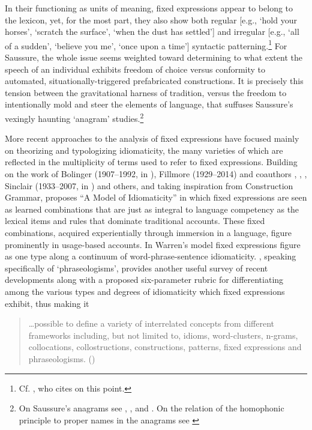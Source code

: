 \documentclass[output=paper]{langsci/langscibook}
\begin{document}
In their functioning as units of meaning, fixed expressions appear to belong to the lexicon, yet, for the most part, they also show both regular [e.g., ‘hold your horses’, ‘scratch the surface’, ‘when the dust has settled’] and irregular [e.g., ‘all of a sudden’, ‘believe you me’, ‘once upon a time’] syntactic patterning.\footnote{{Cf. \citet[2--3]{wood_formulaic_2002}, who cites \citet[36]{richards_two_1983} on this point.}} For Saussure, the whole issue seems weighted toward determining to what extent the speech of an individual exhibits freedom of choice versus conformity to automated, situationally-triggered prefabricated constructions. It is precisely this tension between the gravitational harness of tradition, versus the freedom to intentionally mold and steer the elements of language, that suffuses Saussure’s vexingly haunting ‘anagram’ studies.\footnote{ \textrm{On Saussure’s anagrams see \citealt{guimaraes_presence_2007}, \citeyear{christy_saussures_1999}, and \citeyear{carr_c_1999}. On the relation of the homophonic principle to proper names in the anagrams see \citealt{christy_concept_1995}}}

More recent approaches to the analysis of fixed expressions have focused mainly on theorizing and typologizing idiomaticity, the many varieties of which are reflected in the multiplicity of terms used to refer to fixed expressions. Building on the work of Bolinger (1907--1992, in \citeyear{bolinger_meaning_1976}), Fillmore (1929--2014) and coauthors \citeyear{fillmore_regularity_1988}, \citet{makkai_idiom_1972}, \citet{richards_two_1983}, Sinclair (1933--2007, in \citeyear{sinclair_corpus_1991}) and others, and taking inspiration from Construction Grammar, \citet{warren_model_2005} proposes “A Model of Idiomaticity” in which fixed expressions are seen as learned combinations that are just as integral to language competency as the lexical items and rules that dominate traditional accounts. These fixed combinations, acquired experientially through immersion in a language, figure prominently in usage-based accounts. In Warren’s model fixed expressions figure as one type along a continuum of word-phrase-sentence idiomaticity. \citet{granger_phraseology_2008}, speaking specifically of ‘phraseologisms’, provides another useful survey of recent developments along with a proposed six-parameter rubric for differentiating among the various types and degrees of idiomaticity which fixed expressions exhibit, thus making it 

\begin{quote}
    …possible to define a variety of interrelated concepts from different frameworks including, but not limited to, idioms, word-clusters, n-grams, collocations, collostructions, constructions, patterns, fixed expressions and phraseologisms. (\citealt[21]{granger_phraseology_2008})
\end{quote}
\end{document}
